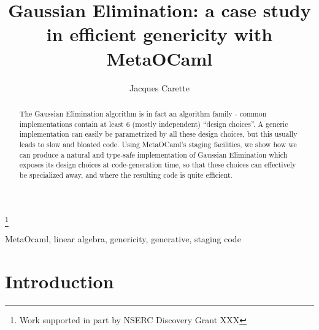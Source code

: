 \documentclass[11pt]{elsart}
\begin{document}
\begin{frontmatter}
\title{Gaussian Elimination: a case study in efficient genericity with
MetaOCaml}
\author{Jacques Carette}
\thanks[nserc]{Work supported in part by NSERC Discovery Grant XXX}


\begin{abstract}
The Gaussian Elimination algorithm is in fact an algorithm family -
common implementations contain at least 6 (mostly independent)
``design choices''.  A generic implementation can easily be parametrized
by all these design choices, but this usually leads to slow and bloated
code.  Using MetaOCaml's staging facilities, we show how we can
produce a natural and type-safe implementation of Gaussian Elimination 
which exposes its design choices at code-generation time, so that these choices
can effectively be specialized away, and where the resulting code is 
quite efficient.
\end{abstract}

\begin{keyword}
MetaOcaml, linear algebra, genericity, generative, staging
\PACS code
\end{keyword}
\end{frontmatter}

\section{Introduction}
\end{document}
